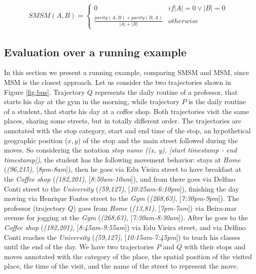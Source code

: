 \documentclass[12pt]{article}
\begin{document}
\begin{equation}
\label{func:SMSM1}
\begin{split}
  SMSM(A, B) = 
  \begin{cases} 
      0 & if  |A| = 0 \vee |B| = 0 \\
      \frac{parity(A, B) + parity(B, A)}{|A| + |B|} & otherwise
  \end{cases}
\end{split}
\end{equation}



\subsection{Evaluation over a running example}

In this section we present a running example, comparing SMSM and MSM, since MSM is the closest approach.
Let us consider the two trajectories shown in Figure \ref{fig:bus}. Trajectory $Q$ represents the daily routine of a professor, that starts his day at the gym in the morning, while trajectory $P$ is the daily routine of a student, that starts his day at a coffee shop. Both trajectories visit the same places, sharing some streets, but in totally different order. The trajectories are annotated with the stop category, start and end time of the stop, an hypothetical geographic position ($x, y$) of the stop and the main street followed during the moves. So considering the {notation \textit{stop name ((x, y), [start timestamp - end timestamp])}}, the student has the following movement behavior: stays at \textit{Home} (\textit{(96,215)}, [\textit{8pm-8am}]), {then} he goes via Edu Vieira street to have breakfast at the \textit{Coffee shop} (\textit{(182,201)}, [\textit{8:50am-10am}]), and from there goes via Delfino Conti street to the \textit{University} (\textit{(59,127)}, [\textit{10:25am-6:10pm}]), finishing the day moving via Henrique Fontes street to the \textit{Gym} (\textit{(268,63)}, [\textit{7:30pm-9pm}]). The professor (trajectory $Q$) goes from \textit{Home} (\textit{(13,81)}, [\textit{7pm-7am}]) via Beira-mar avenue for jogging at the \textit{Gym} (\textit{(268,63)}, [\textit{7:30am-8:30am}]). After he goes to the \textit{Coffee shop} (\textit{(182,201)}, [\textit{8:45am-9:55am}]) via Edu Vieira street, and via Delfino Conti reaches the \textit{University} (\textit{(59,127)}, [\textit{10:15am-7:45pm}]) to teach his classes until the end of the day. We have two trajectories $P$ and $Q$ with their stops and moves annotated with the category of the place, the spatial position of the visited place, the time of the visit, and the name of the street to represent the move.
\end{document}
